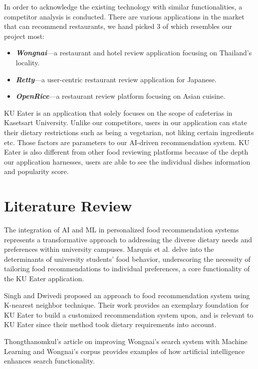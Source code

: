 In order to acknowledge the existing technology with similar functionalities, a competitor analysis is conducted.
There are various applications in the market that can recommend restaurants, we hand picked 3 of which resembles our project most:

\begin{itemize}
    \item \textbf{\textit{Wongnai}}---a restaurant and hotel review application focusing on Thailand's locality.
    \item \textbf{\textit{Retty}}---a user-centric restaurant review application for Japanese.
    \item \textbf{\textit{OpenRice}}---a restaurant review platform focusing on Asian cuisine.
\end{itemize}

\par
KU Eater is an application that solely focuses on the scope of cafeterias in Kasetsart University.
Unlike our competitors, users in our application can state their dietary restrictions such as being a vegetarian,
not liking certain ingredients etc. Those factors are parameters to our AI-driven recommendation system.
KU Eater is also different from other food reviewing platforms because of the depth our application harnesses,
users are able to see the individual dishes information and popularity score.

\section{Literature Review}
\label{section:literature-review}

The integration of AI and ML in personalized food recommendation systems represents a transformative approach to addressing
the diverse dietary needs and preferences within university campuses. Marquis et al. \cite{marquisetal:2018}
delve into the determinants of university students' food behavior, underscoring the necessity of tailoring
food recommendations to individual preferences, a core functionality of the KU Eater application.

Singh and Dwivedi \cite{singhanddwivedi:2023} proposed an approach to food recommendation system using K-nearest neighbor technique.
Their work provides an exemplary foundation for KU Eater to build a customized recommendation system upon,
and is relevant to KU Eater since their method took dietary requirements into account.

Thongthanomkul's \cite{thongthanomkul:2020} article on improving Wongnai's search system with Machine Learning
and Wongnai's \cite{wongnaicorpus:github} corpus provides examples of how artificial intelligence enhances search functionality.

